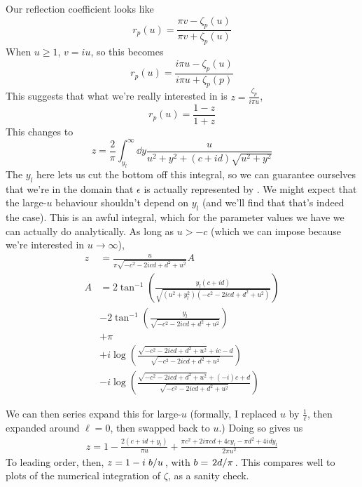 \documentclass[../main.tex]{subfiles}
\begin{document}
	Our reflection coefficient looks like
	\begin{equation}
		r_p(u) = \frac{\pi v - \zeta_p(u)}{\pi v + \zeta_p(u)}
	\end{equation}
	When $u \geq 1$, $v = i u$, so this becomes
	\begin{equation}
		r_p(u) = \frac{i \pi u - \zeta_p(u)}{i \pi u + \zeta_p(p)}
	\end{equation}
	This suggests that what we're really interested in is $z = \frac{\zeta_p}{i \pi u}$,
	\begin{equation}
		r_p(u) = \frac{1 - z}{1 + z} \label{eq:rpdef}
	\end{equation}
	This changes  to
	\begin{equation}
		z = \frac{2}{\pi} \int_{y_l}^\infty \dd{y} \frac{u}{u^2 + y^2 + (c + id)\sqrt{u^2 + y^2}}
	\end{equation}
	The $y_l$ here lets us cut the bottom off this integral, so we can guarantee ourselves that we're in the domain that $\epsilon$ is actually represented by .
	We might expect that the large-$u$ behaviour shouldn't depend on $y_l$ (and we'll find that that's indeed the case).
	This is an awful integral, which for the parameter values we have we can actually do analytically.
	As long as $u > -c$ (which we can impose because we're interested in $u \rightarrow \infty$),
	\begin{align}
		z &= \frac{u}{{\pi  \sqrt{-c^2-2 i c d+d^2+u^2}}} A\\
		A &= 2 \tan ^{-1}\left(\frac{y_l (c+i d)}{\sqrt{\left(u^2+y_l^2\right) \left(-c^2-2 i c d+d^2+u^2\right)}}\right)\\
		&-2 \tan ^{-1}\left(\frac{y_l}{\sqrt{-c^2-2 i c d+d^2+u^2}}\right) \\
		&+ \pi \\
		&+i \log \left(\frac{\sqrt{-c^2-2 i c d+d^2+u^2}+i c-d}{\sqrt{-c^2-2 i c d+d^2+u^2}}\right) \\
		&-i \log \left(\frac{\sqrt{-c^2-2 i c d+d^2+u^2}+(-i) c+d}{\sqrt{-c^2-2 i c d+d^2+u^2}}\right)
	\end{align}

	We can then series expand this for large-$u$ (formally, I replaced $u$ by $\frac{1}{\ell}$, then expanded around $\ell = 0$, then swapped back to $u$.)
	Doing so gives us
	\begin{align}
		z = 1 -\frac{2 (c+i d+y_l)}{\pi  u} + \frac{\pi  c^2+2 i \pi  c d+4 c y_l-\pi  d^2+4 i d y_l}{2 \pi  u^2}
	\end{align}
	To leading order, then, $z = 1 - i \flatfrac{b}{u}$, with $b = \flatfrac{2 d}{\pi}$.
	This compares well to plots of the numerical integration of $\zeta$, as a sanity check. 
\end{document}
